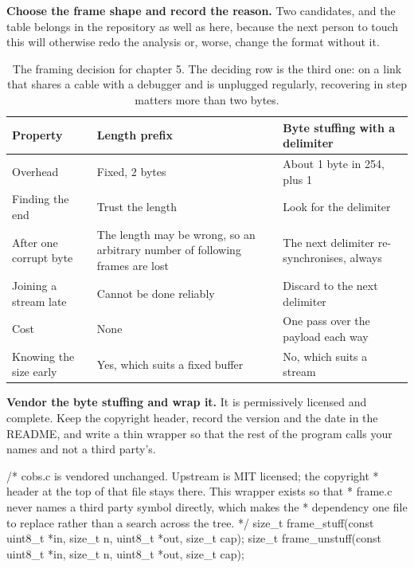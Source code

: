 \begin{steps}
\item \textbf{Choose the frame shape and record the reason.} Two candidates,
and the table belongs in the repository as well as here, because the next
person to touch this will otherwise redo the analysis or, worse, change the
format without it.

\begin{table}[H]\centering\small
\begin{tabular}{p{30mm}p{48mm}p{48mm}}
\toprule
Property & Length prefix & Byte stuffing with a delimiter \\
\midrule
Overhead & Fixed, 2 bytes & About 1 byte in 254, plus 1 \\
Finding the end & Trust the length & Look for the delimiter \\
After one corrupt byte & The length may be wrong, so an arbitrary number of following frames are lost & The next delimiter re-synchronises, always \\
Joining a stream late & Cannot be done reliably & Discard to the next delimiter \\
Cost & None & One pass over the payload each way \\
Knowing the size early & Yes, which suits a fixed buffer & No, which suits a stream \\
\bottomrule
\end{tabular}
\caption{The framing decision for chapter 5. The deciding row is the third one: on a link that shares a cable with a debugger and is unplugged regularly, recovering in step matters more than two bytes.}
\end{table}

\item \textbf{Vendor the byte stuffing and wrap it.} It is permissively
licensed and complete. Keep the copyright header, record the version and the
date in the README, and write a thin wrapper so that the rest of the program
calls your names and not a third party's.
\begin{ccode}
/* cobs.c is vendored unchanged. Upstream is MIT licensed; the copyright
 * header at the top of that file stays there. This wrapper exists so that
 * frame.c never names a third party symbol directly, which makes the
 * dependency one file to replace rather than a search across the tree. */
size_t frame_stuff(const uint8_t *in, size_t n, uint8_t *out, size_t cap);
size_t frame_unstuff(const uint8_t *in, size_t n, uint8_t *out, size_t cap);
\end{ccode}


\end{steps}
